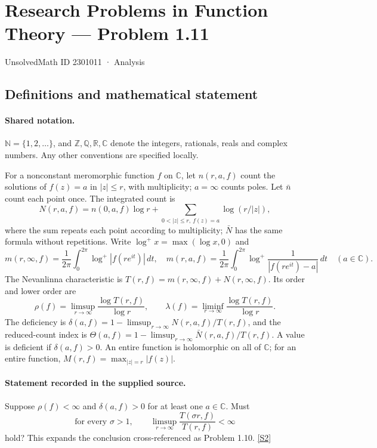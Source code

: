 \documentclass[11pt]{article}
\newcommand{\sref}[2]{\hyperlink{source:#1:#2}{[S#2]}}
\begin{document}
\setcounter{section}{2301010}
\section{Research Problems in Function Theory — Problem 1.11}\label{2301011}
{\small\sffamily UnsolvedMath ID 2301011 · Analysis}
\subsection{Definitions and mathematical statement}

\paragraph{Shared notation.}$\mathbb N=\{1,2,\ldots\}$, and $\mathbb Z,\mathbb Q,\mathbb R,\mathbb C$ denote the integers, rationals, reals and complex numbers. Any other conventions are specified locally.


For a nonconstant meromorphic function $f$ on $\mathbb C$, let $n(r,a,f)$ count the solutions of $f(z)=a$ in $|z|\le r$, with multiplicity; $a=\infty$ counts poles. Let $\bar n$ count each point once. The integrated count is
\[
 N(r,a,f)=n(0,a,f)\log r+\sum_{0<|z|\le r,\ f(z)=a}\log(r/|z|),
\]
where the sum repeats each point according to multiplicity; $\bar N$ has the same formula without repetitions. Write $\log^+x=\max(\log x,0)$ and
\[
 m(r,\infty,f)=\frac1{2\pi}\int_0^{2\pi}\log^+|f(re^{it})|\,dt,\quad
 m(r,a,f)=\frac1{2\pi}\int_0^{2\pi}\log^+\frac1{|f(re^{it})-a|}\,dt\quad(a\in\mathbb C).
\]
The Nevanlinna characteristic is $T(r,f)=m(r,\infty,f)+N(r,\infty,f)$. Its order and lower order are
\[
 \rho(f)=\limsup_{r\to\infty}\frac{\log T(r,f)}{\log r},\qquad
 \lambda(f)=\liminf_{r\to\infty}\frac{\log T(r,f)}{\log r}.
\]
The deficiency is $\delta(a,f)=1-\limsup_{r\to\infty}N(r,a,f)/T(r,f)$, and the reduced-count index is $\Theta(a,f)=1-\limsup_{r\to\infty}\bar N(r,a,f)/T(r,f)$. A value is deficient if $\delta(a,f)>0$. An entire function is holomorphic on all of $\mathbb C$; for an entire function, $M(r,f)=\max_{|z|=r}|f(z)|$.
\paragraph{Statement recorded in the supplied source.}
Suppose $\rho(f)<\infty$ and $\delta(a,f)>0$ for at least one $a\in\mathbb C$. Must
\[
 \text{for every }\sigma>1,\qquad
 \limsup_{r\to\infty}\frac{T(\sigma r,f)}{T(r,f)}<\infty
\]
hold? This expands the conclusion cross-referenced as Problem 1.10. \sref{2301011}{2}
\end{document}
